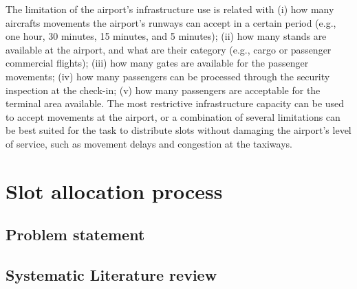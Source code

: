 The limitation of the airport’s infrastructure use is related with (i) how many aircrafts movements the airport’s runways can accept in a certain period (e.g., one hour, 30 minutes, 15 minutes, and 5 minutes); (ii) how many stands are available at the airport, and what are their category (e.g., cargo or passenger commercial flights); (iii) how many gates are available for the passenger movements; (iv) how many passengers can be processed through the security inspection at the check-in; (v) how many passengers are acceptable for the terminal area available. The most restrictive infrastructure capacity can be used to accept movements at the airport, or a combination of several limitations can be best suited for the task to distribute slots without damaging the airport’s level of service, such as movement delays and congestion at the taxiways. 


\section{Slot allocation process}%

\subsection{Problem statement}
\subsection{Systematic Literature review}